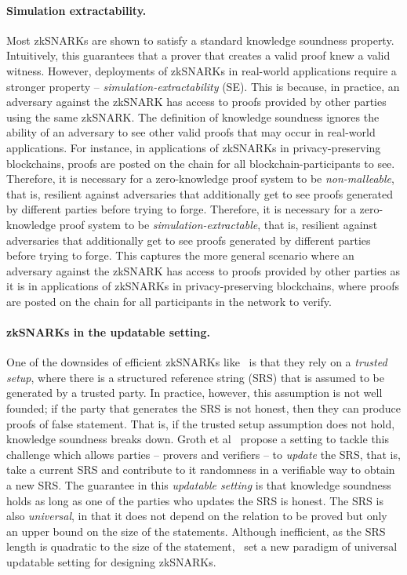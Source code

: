 \paragraph{Simulation extractability.}

Most zkSNARKs are shown to satisfy a standard knowledge soundness property. Intuitively, this guarantees that
a prover that creates a valid proof knew a valid witness. However, deployments of zkSNARKs in real-world applications require a stronger property -- \textit{simulation-extractability} (SE). 
This is because, in practice, an adversary against the zkSNARK has access to proofs provided by other parties using the same
zkSNARK. The definition of knowledge soundness ignores the ability of an adversary to see other valid proofs that may occur in real-world applications.  For instance, in applications of
zkSNARKs in privacy-preserving blockchains, proofs are posted on the chain for all
blockchain-participants to see. Therefore, it is necessary for a zero-knowledge proof system to be \emph{non-malleable}, that is, resilient against adversaries that additionally get to see proofs generated by different parties before trying to forge.
Therefore, it is necessary for a zero-knowledge proof system to be \emph{simulation-extractable}, that is, resilient against adversaries that additionally get to see proofs generated by different parties before trying to forge.
This captures the more general scenario where an adversary against the zkSNARK has access to proofs provided by other parties as it is in applications of zkSNARKs in privacy-preserving blockchains, where proofs are posted on the chain for all
participants in the network to verify. 

\paragraph{zkSNARKs in the updatable setting.}
One of the downsides of efficient zkSNARKs like~\cite{AC:Groth10a,TCC:Lipmaa12,EC:GGPR13,SP:PHGR13,AC:Lipmaa13,AC:DFGK14,EC:Groth16} is that they rely on a \textit{trusted setup}, where there is a structured reference string (SRS) that is assumed to be generated by a trusted party. In practice, however, this assumption is not well founded; if the party that generates the SRS is not honest, then they can produce proofs of false statement. That is, if the trusted setup assumption does not hold, knowledge soundness breaks down.
Groth et al~\cite{C:GKMMM18} propose a setting to tackle this challenge which allows parties -- provers and verifiers -- to \emph{update} the SRS, that is, take a current SRS and contribute to it randomness in a verifiable way to obtain a new SRS. The guarantee in this \textit{updatable setting} is that knowledge soundness holds as long as one of the parties who updates the SRS is honest. The SRS is also \emph{universal}, in that it does not depend on the relation to be proved but only an upper bound on the size of the statements.
Although inefficient, as the SRS length is quadratic to the size of the statement,~\cite{C:GKMMM18} set a new
paradigm of universal updatable setting for designing zkSNARKs.

